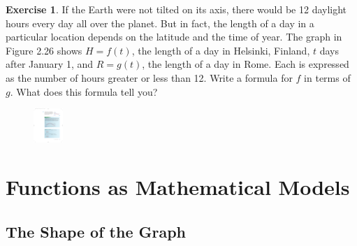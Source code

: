 \documentclass[10pt,]{book}
\theoremstyle{plain}
\theoremstyle{definition}
\theoremstyle{definition}
\theoremstyle{definition}
\theoremstyle{definition}
\theoremstyle{definition}
\newtheorem{exercise}[theorem]{Exercise}
\numberwithin{equation}{section}
\begin{document}
\begin{exercise}\label{daylight-hours}
If the Earth were not tilted on its axis, there would be 12 daylight hours every day all over the planet. But in fact, the length of a day in a particular location depends on the latitude and the time of year. The graph in Figure 2.26 shows \(H = f (t)\), the length of a day in Helsinki, Finland, \(t\) days after January 1, and \(R = g(t)\), the length of a day in Rome. Each is expressed as the number of hours greater or less than 12. Write a formula for \(f\) in terms of \(g\). What does this formula tell you?%
\leavevmode%
\begin{figure}
\centering
\includegraphics[width=0.100\textwidth,]{images/fig-daylight-hours.pdf}\caption{\label{fig-daylight-hours}}
\end{figure}
\end{exercise}
\typeout{************************************************}
\typeout{************************************************}
\section[Functions as Mathematical Models]{Functions as Mathematical Models}\label{MathModels}
\typeout{************************************************}
\typeout{************************************************}
\subsection[The Shape of the Graph]{The Shape of the Graph}\label{subsection-45}
\end{document}
